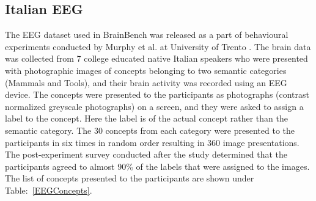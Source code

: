 \subsection{Italian EEG}
The EEG dataset used in BrainBench was released as a part of behavioural experiments conducted by Murphy et al. at University of Trento \cite{MurphyEEG}. The brain data was collected from 7 college educated native Italian speakers who were presented with photographic images of concepts belonging to two semantic categories (Mammals and Tools), and their brain activity was recorded using an EEG device. The concepts were presented to the participants as photographs (contrast normalized
greyscale photographs) on a screen, and they were asked to assign a label to the concept. Here the label is of the actual concept rather than the semantic category. The 30 concepts from each category were presented to the participants in six times in random order resulting in 360 image presentations. The post-experiment survey conducted after the study determined that the participants agreed to almost 90\% of the labels that were assigned to the images. The list of concepts presented to the participants are shown under Table:~\ref{EEGConcepts}.
